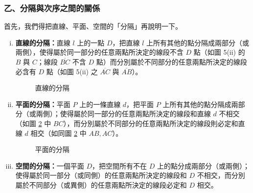 \subsubsection*{乙、分隔與次序之間的關係}

首先，我們得把直線、平面、空間的「分隔」再說明一下。
\begin{enumerate}[(i), leftmargin=2.5em]
  \item \textbf{直線的分隔：}直線 $l$ 上的一點 $D$，把直線 $l$ 上所有其他的點分隔成兩部分（或兩側），使得屬於同一部分的任意兩點所決定的線段不含 $D$ 點（如圖 5(ii) 的 $B$ 與 $C$；線段 $\overline{BC}$ 不含 $D$ 點）而分別屬於不同部分的任意兩點所決定的線段必含有 $D$ 點（如圖 5(ii) 之 $\overline{AC}$ 與 $\overline{AB}$）。

  \begin{figure}[H]
  \centering
  \caption{直線的分隔}
  \label{fig:b3s-a1-5-2}
  \end{figure}

  \item \textbf{平面的分隔：}平面 $P$ 上的一條直線 $d$，把平面 $P$ 上所有其他的點分隔成兩部分（或兩側）；使得屬於同一部分的任意兩點所決定的線段和直線 $d$ 不相交（如圖 \ref{fig:b3s-a1-7} 中 $BC$），而分別屬於不同部分的任意兩點所決定的線段則必定和直線 $d$ 相交（如同圖 \ref{fig:b3s-a1-7} 中 $AB, AC$）。

  \begin{figure}[H]
  \centering
  \caption{平面的分隔}
  \label{fig:b3s-a1-7}
  \end{figure}

  \item \textbf{空間的分隔：}一個平面 $D$，把空間所有不在 $D$ 上的點分成兩部分（或兩側）；使得屬於同一部分（或同側）的任意兩點所決定的線段和 $D$ 不相交，而分別屬於不同部分（或異側）的任意兩點所決定的線段必定和 $D$ 相交。


\end{enumerate}
